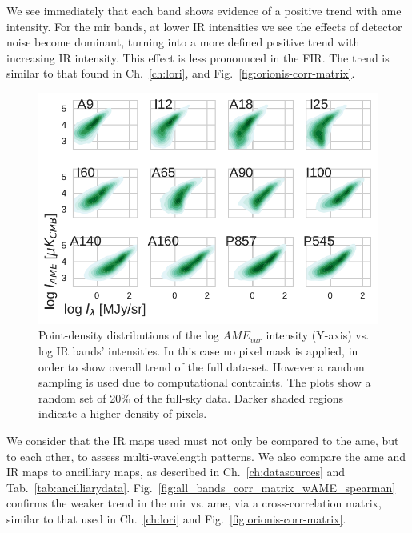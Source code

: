         We see immediately that each band shows evidence of a positive trend with \gls{ame} intensity. For the \gls{mir} bands, at lower IR intensities we see the effects of detector noise become dominant, turning into a more defined positive trend with increasing IR intensity. This effect is less pronounced in the FIR. The trend is similar to that found in Ch.~\ref{ch:lori}, and Fig.~\ref{fig:orionis-corr-matrix}.
          \begin{figure}
            \includegraphics[width=\textwidth]{../Plots/ch_allsky/AMEvsDust_allsky_allbands_mpsub_kde_unmasked.pdf}
            \centering
            \caption{Point-density distributions of the log $AME_{var}$ intensity (Y-axis) vs. log IR bands' intensities. In this case no pixel mask is applied, in order to show overall trend of the full data-set. However a random sampling is used due to computational contraints. The plots show a random set of 20\% of the full-sky data. Darker shaded regions indicate a higher density of pixels.}
            \label{fig:AMEvsDust_allsky_allbands_mpsub_kde_unmasked}
          \end{figure}
        We consider that the IR maps used must not only be compared to the \gls{ame}, but to each other, to assess multi-wavelength patterns. We also compare the \gls{ame} and IR maps to ancilliary maps, as described in Ch.~\ref{ch:datasources} and Tab.~\ref{tab:ancilliarydata}. Fig.~\ref{fig:all_bands_corr_matrix_wAME_spearman} confirms the weaker trend in the \gls{mir} vs. \gls{ame}, via a cross-correlation matrix, similar to that used in Ch.~\ref{ch:lori} and Fig.~\ref{fig:orionis-corr-matrix}.
